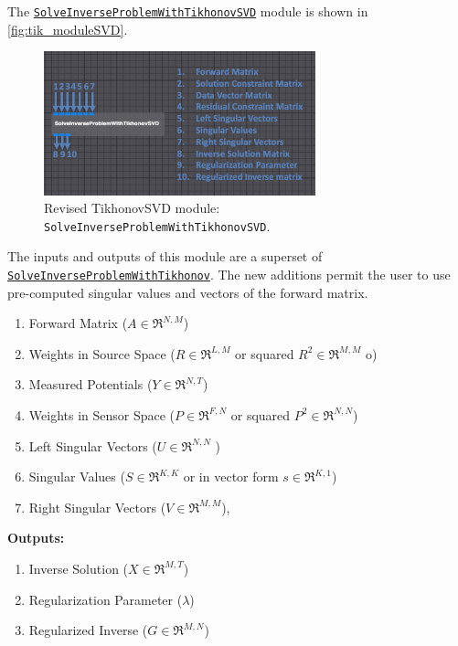     The \href{http://scirundocwiki.sci.utah.edu/SCIRunDocs/index.php5/CIBC:Documentation:SCIRun:Reference:BioPSE:SolveInverseProblemWithTikhonovSVD}{{\tt SolveInverseProblemWithTikhonovSVD}} module is shown in \autoref{fig:tik_moduleSVD}.
    \begin{figure}
        \begin{center}
        \includegraphics[width=0.7\textwidth]{ECGToolkitGuide_figures/TikhonovSVD_module.png}
        \caption{Revised TikhonovSVD module: {\tt SolveInverseProblemWithTikhonovSVD}.  }
        \label{fig:tik_moduleSVD}
        \end{center}
    \end{figure}
    The inputs and outputs of this module are a superset of \href{http://scirundocwiki.sci.utah.edu/SCIRunDocs/index.php/CIBC:Documentation:SCIRun:Reference:BioPSE:SolveInverseProblemWithTikhonov}{{\tt SolveInverseProblemWithTikhonov}}.
    The new additions permit the user to use pre-computed singular values and vectors of the forward matrix.
    \begin{enumerate}
        \item Forward Matrix ($A\in\Re^{N,M}$)
        \item Weights in Source Space ($R\in\Re^{L,M}$ or squared $R^2\in\Re^{M,M}$ o)
        \item Measured Potentials ($Y\in\Re^{N,T}$)
        \item Weights in Sensor Space ($P\in\Re^{F,N}$ or squared $P^2\in\Re^{N,N}$)
        \item Left Singular Vectors ($U\in\Re^{N,N}$ )
        \item Singular Values ($S\in\Re^{K,K}$ or in vector form $s\in\Re^{K,1}$)
        \item Right Singular Vectors ($V\in\Re^{M,M}$),
    \end{enumerate}
    {\bf Outputs:}
     \begin{enumerate}
        \item Inverse Solution ($X\in\Re^{M,T}$)
        \item Regularization Parameter ($\lambda$)
        \item Regularized Inverse ($G\in\Re^{M,N}$)
    \end{enumerate}
    
